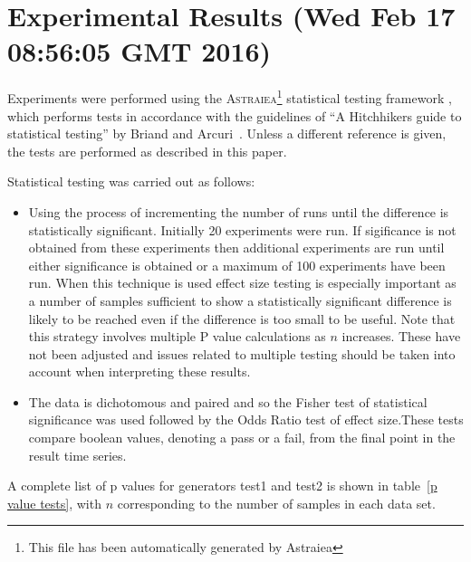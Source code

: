\documentclass[]{article}
\begin{document}
\section{Experimental Results (Wed Feb 17 08:56:05 GMT 2016)}
Experiments were performed using the \textsc{Astraiea}\footnote{This file has been automatically generated by Astraiea} statistical testing framework \cite{Neumann:2014:EET:2598394.2609850},
which performs tests in accordance with the guidelines of ``A Hitchhikers guide to statistical testing''
by Briand and Arcuri~\cite{Arcuri2012}.
Unless a different reference is given, the tests are performed as described in this paper.



Statistical testing was carried out as follows: 
\begin{itemize}
\item{Using the process of incrementing the number of runs until the difference is statistically significant. Initially 20 experiments were run. If sigificance is not obtained from these experiments then additional experiments are run until either significance is obtained or a maximum of 100 experiments have been run. When this technique is used effect size testing is especially important as a number of samples sufficient to show a statistically significant difference is likely to be reached even if the difference is too small to be useful. Note that this strategy involves multiple P value calculations as $n$ increases. These have not been adjusted and issues related to multiple testing should be taken into account when interpreting these results.
}
\item{The data is dichotomous and paired and so the Fisher test of statistical significance was used followed by the Odds Ratio test of effect size.These tests compare boolean values, denoting a pass or a fail, from the final point in the result time series. }
\end{itemize}A complete list of p values for generators test1 and test2 is shown in table~\ref{p value tests}, with $n$ corresponding to the number of samples in each data set.
\end{document}
